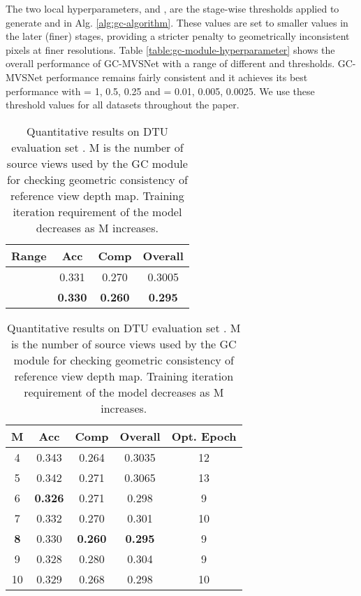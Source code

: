 \documentclass[10pt,twocolumn,letterpaper]{article}
\begin{document}
The two local hyperparameters,  and , are the
stage-wise thresholds applied to generate  and
 in Alg. \ref{alg:gc-algorithm}. These values are set to smaller values in the later (finer) stages,
providing a stricter
penalty to geometrically inconsistent pixels at finer
resolutions. Table \ref{table:gc-module-hyperparameter} shows the
overall performance of GC-MVSNet with a range of different 
and  thresholds. GC-MVSNet performance remains fairly consistent and it achieves its best performance
with = 1, 0.5, 0.25 and = 0.01, 0.005, 0.0025. We
use these threshold values for all datasets throughout the paper.










\begin{table}[t]
  \begin{center}
    {\footnotesize{
\begin{tabular}{cccc}
\toprule
 Range  & Acc & Comp & Overall \\
\midrule
 & 0.331 & 0.270 & 0.3005 \\ 
 & \textbf{0.330} & \textbf{0.260} & \textbf{0.295} \\
\bottomrule
\end{tabular}}}
\vspace{-6pt}
\caption{Impact of range of  during training on DTU with =8, =5. Numbers are generated on DTU evaluation set.}
\label{table:range-of-per-pixel-penalty}
\vspace{-10pt}
\end{center}


\begin{center}
    {\footnotesize{
\begin{tabular}{ccccc}
\toprule
M  & Acc & Comp & Overall & Opt. Epoch\\
\midrule
4 & 0.343 & 0.264  &  0.3035  & 12\\
5 & 0.342 & 0.271  & 0.3065   &  13\\
6 & \textbf{0.326} & 0.271  &  0.298  & 9 \\
7 & 0.332 &  0.270 &  0.301  & 10 \\
\textbf{8} & 0.330 &  \textbf{0.260} &  \textbf{0.295}  & 9 \\
9 & 0.328 &  0.280 & 0.304  & 9 \\
10 & 0.329 & 0.268  &  0.298 & 10 \\
\bottomrule
\end{tabular}}}
\vspace{-6pt}
\caption{Quantitative results on DTU evaluation set \cite{jensen2014dtu}. M is the number of source views used by the GC module for checking geometric consistency of reference view depth map. Training iteration requirement of the model decreases as M increases.}
\label{table:src views gc check ablation}
\end{center}
\vspace{-30pt}
\end{table}
\end{document}
